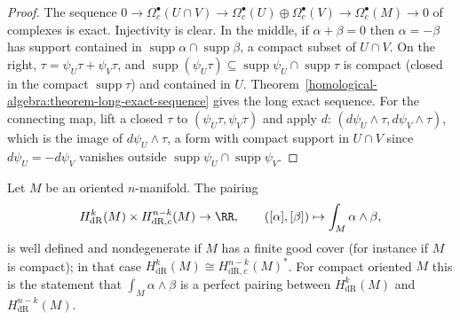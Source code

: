 \begin{proof}
The sequence $0 \to \Omega^\bullet_c(U \cap V) \to \Omega^\bullet_c(U) \oplus \Omega^\bullet_c(V) \to \Omega^\bullet_c(M) \to 0$ of complexes is exact. Injectivity is clear. In the middle, if $\alpha + \beta = 0$ then $\alpha = -\beta$ has support
contained in $\operatorname{supp}\alpha \cap \operatorname{supp}\beta$, a compact subset of $U \cap V$. On the right, $\tau = \psi_U\tau + \psi_V\tau$, and $\operatorname{supp}(\psi_U\tau) \subseteq \operatorname{supp}\psi_U \cap \operatorname{supp}\tau$
is compact (closed in the compact $\operatorname{supp}\tau$) and contained in $U$. Theorem~\ref{homological-algebra:theorem-long-exact-sequence} gives the long exact sequence. For the connecting map, lift a closed $\tau$ to
$(\psi_U\tau, \psi_V\tau)$ and apply $d$: $(d\psi_U \wedge \tau, d\psi_V \wedge \tau)$, which is the image of $d\psi_U \wedge \tau$, a form with compact support in $U \cap V$ since $d\psi_U = -d\psi_V$ vanishes outside
$\operatorname{supp}\psi_U \cap \operatorname{supp}\psi_V$.
\end{proof}

\begin{theorem}\label{de-rham:theorem-poincare-duality-de-rham}
Let $M$ be an oriented $n$-manifold. The pairing
\[
H^k_{\mathrm{dR}}(M) \times H^{n-k}_{\mathrm{dR},c}(M) \to \RR, \qquad ([\alpha], [\beta]) \mapsto \int_M\alpha \wedge \beta,
\]
is well defined and nondegenerate if $M$ has a finite good cover (for instance if $M$ is compact); in that case $H^k_{\mathrm{dR}}(M) \cong H^{n-k}_{\mathrm{dR},c}(M)^*$. For compact oriented $M$ this is the
statement that $\int_M\alpha \wedge \beta$ is a perfect pairing between $H^k_{\mathrm{dR}}(M)$ and $H^{n-k}_{\mathrm{dR}}(M)$.
\end{theorem}

